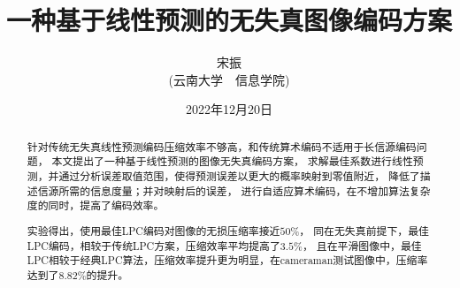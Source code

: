 \documentclass[12pt,a4paper]{article}%
\title{\fontsize{18pt}{27pt}\selectfont%
	{\heiti%
        一种基于线性预测的无失真图像编码方案}}%
\author{\fontsize{12pt}{18pt}\selectfont%
	{\fangsong%
		宋振}
        \\
	\fontsize{10.5pt}{15.75pt}\selectfont%
	{\fangsong%
		(云南大学~~信息学院)}}%
\date{2022年12月20日}%
\begin{document}
\maketitle  %

\lhead{} %
\rhead{} %
\lfoot{} %
\rfoot{} %
\cfoot{\thepage} %


\begin{abstract}
    \fangsong 针对传统无失真线性预测编码压缩效率不够高，和传统算术编码不适用于长信源编码问题，
    本文提出了一种基于线性预测的图像无失真编码方案，
    求解最佳系数进行线性预测，并通过分析误差取值范围，使得预测误差以更大的概率映射到零值附近，
    降低了描述信源所需的信息度量；并对映射后的误差，
    进行自适应算术编码，在不增加算法复杂度的同时，提高了编码效率。

    实验得出，使用最佳LPC编码对图像的无损压缩率接近$50\%$，
    同在无失真前提下，最佳LPC编码，相较于传统LPC方案，压缩效率平均提高了$3.5\%$，
    且在平滑图像中，最佳LPC相较于经典LPC算法，压缩效率提升更为明显，在cameraman测试图像中，压缩率达到了$8.82\%$的提升。

\end{abstract}

\begin{adjustwidth}{1.06cm}{1.06cm}
    \fontsize{10.5pt}{15.75pt}\\
\end{adjustwidth}

\end{document}
